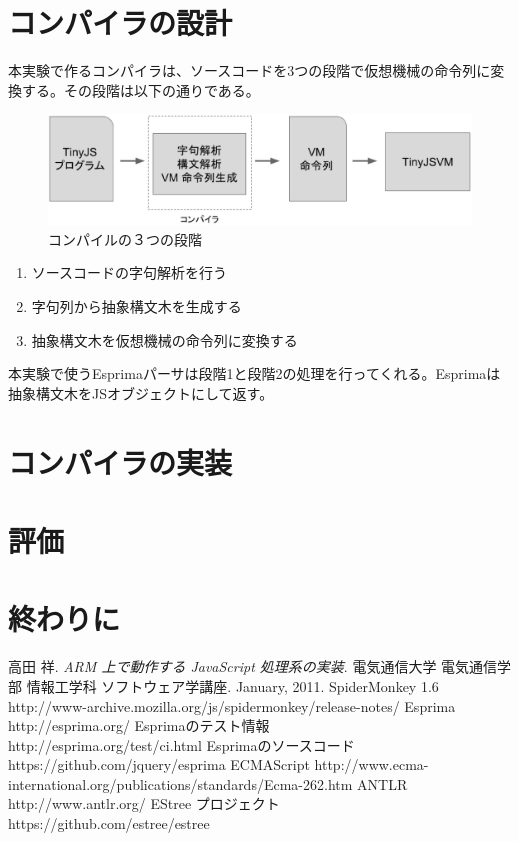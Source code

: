 \documentclass[12pt]{article}
\begin{document}
\section{コンパイラの設計}
本実験で作るコンパイラは、ソースコードを3つの段階で仮想機械の命令列に変換する。その段階は以下の通りである。

\begin{figure}
\centering
\includegraphics[scale=0.5]{process.eps}
\caption{コンパイルの３つの段階}
\end{figure}
\FloatBarrier

\begin{enumerate}
\item ソースコードの字句解析を行う
\item 字句列から抽象構文木を生成する
\item 抽象構文木を仮想機械の命令列に変換する
\end{enumerate}

本実験で使うEsprimaパーサは段階1と段階2の処理を行ってくれる。Esprimaは抽象構文木をJSオブジェクトにして返す。

\section{コンパイラの実装}

\section{評価}

\section{終わりに}

\newpage
\begin{thebibliography}{9}
高田 祥. \textit{ARM 上で動作する JavaScript 処理系の実装}. 電気通信大学 電気通信学部
情報工学科 ソフトウェア学講座. January, 2011.
SpiderMonkey 1.6 \newline
http://www-archive.mozilla.org/js/spidermonkey/release-notes/
Esprima \newline
http://esprima.org/
Esprimaのテスト情報 \\
http://esprima.org/test/ci.html
Esprimaのソースコード \\
https://github.com/jquery/esprima
ECMAScript \newline
http://www.ecma-international.org/publications/standards/Ecma-262.htm
ANTLR \newline
http://www.antlr.org/
EStree プロジェクト \\
https://github.com/estree/estree
\end{thebibliography}
\end{document}
